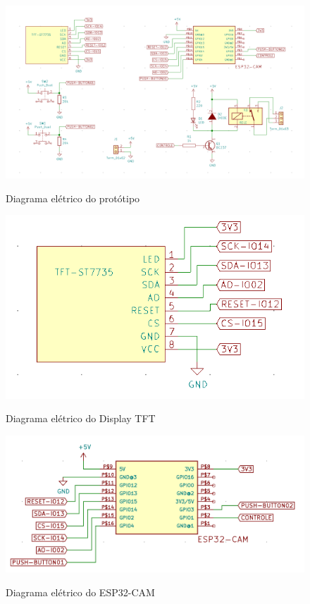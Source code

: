 \begin{figure}[h!]
    \centering
    \caption{Diagrama elétrico do protótipo}
    \includegraphics[scale=0.3]{figuras/circuito_completo.png}
    \fonte{}%
    \label{fig:circuito}
    \centering
\end{figure}

\begin{figure}[h!]
    \centering
    \caption{Diagrama elétrico do Display TFT}
    \includegraphics[scale=0.4]{figuras/modulo_tft.png}
    \fonte{}%
    \label{fig:diagramatft}
    \centering
\end{figure}

\begin{figure}[h!]
    \centering
    \caption{Diagrama elétrico do ESP32-CAM}
    \includegraphics[scale=0.35]{figuras/modulo_esp.png}
    \fonte{}%
    \label{fig:diagramaesp}
    \centering
\end{figure}


